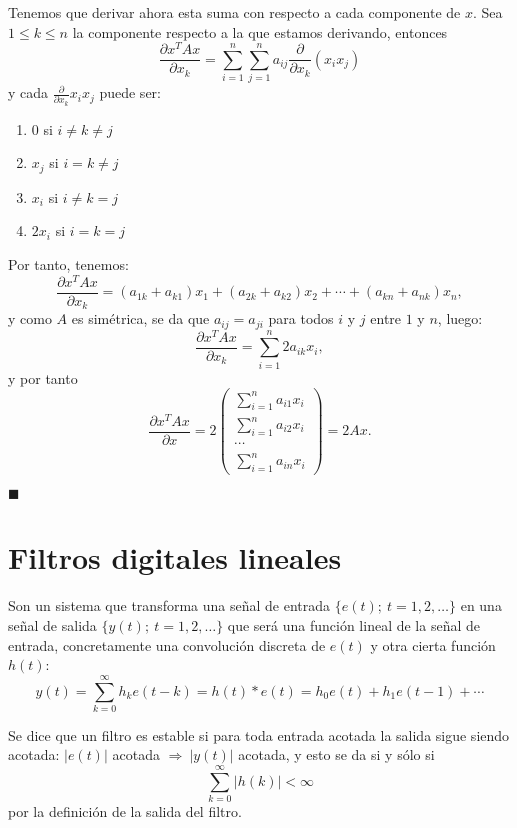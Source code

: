 Tenemos que derivar ahora esta suma con respecto a cada componente de $x$. Sea $1 \leq k \leq n$ la componente respecto a la que estamos derivando, entonces 
\[	\frac{\partial x^TAx}{\partial x_k} = \sum_{i=1}^n \sum_{j=1}^n a_{ij} \frac{\partial}{\partial x_k} (x_ix_j)	\]
y cada $\frac{\partial}{\partial x_k} x_ix_j$ puede ser:
\begin{enumerate}
\item 0 si $i \neq k \neq j$
\item $x_j$ si $i = k \neq j$
\item $x_i$ si $ i \neq k = j$
\item $2x_i$ si $i = k = j$
\end{enumerate}

Por tanto, tenemos:
\[	\frac{\partial x^TAx}{\partial x_k} = (a_{1k} + a_{k1})x_1 + (a_{2k} + a_{k2})x_2 + \cdots + (a_{kn}+a_{nk})x_n,	\]
y como $A$ es simétrica, se da que $a_{ij} = a_{ji}$ para todos $i$ y $j$ entre $1$ y $n$, luego:
\[	\frac{\partial x^TAx}{\partial x_k} = \sum_{i=1}^n 2a_{ik}x_i,	\]
y por tanto
\[	\frac{\partial x^TAx}{\partial x} = 2
\left( \begin{array}{c}
\sum_{i=1}^n a_{i1}x_i \\
\sum_{i=1}^n a_{i2}x_i \\
\cdots \\
\sum_{i=1}^n a_{in}x_i \end{array} \right) = 2Ax.	\]
\begin{flushright}
$\blacksquare$
\end{flushright}

\section{Filtros digitales lineales}

Son un sistema que transforma una señal de entrada $\{e(t);\ t=1,2,\dots\}$ en una señal de salida $\{y(t);\ t=1,2,\dots \}$ que será una función lineal de la señal de entrada, concretamente una convolución discreta de $e(t)$ y otra cierta función $h(t)$:
\[	y(t) = \sum_{k=0}^{\infty} h_k e(t-k) = h(t) \ast e(t) = h_0 e(t) + h_1 e(t-1) + \cdots	\]

\begin{definicion}
Se dice que un filtro es estable si para toda entrada acotada la salida sigue siendo acotada: $|e(t)|$ acotada $\Rightarrow \ |y(t)|$ acotada, y esto se da si y sólo si
\[ \sum_{k=0}^{\infty} |h(k)| < \infty 	\]
por la definición de la salida del filtro.
\end{definicion}

